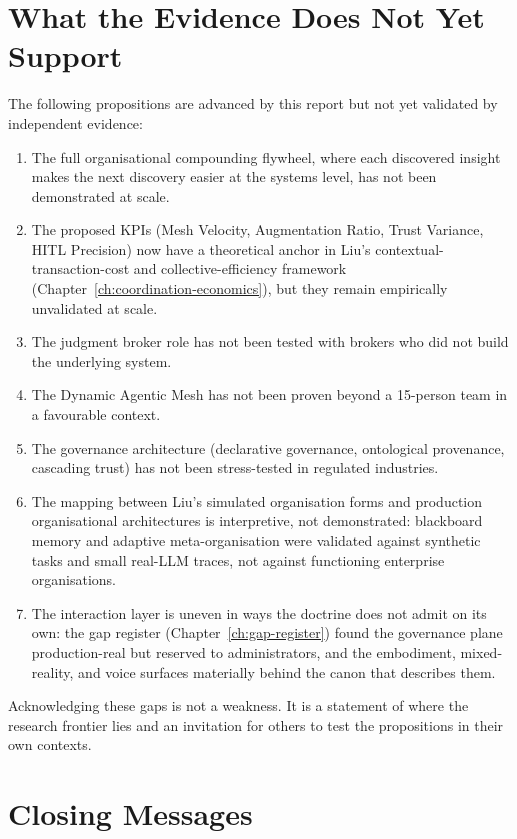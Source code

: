 \section{What the Evidence Does Not Yet Support}

The following propositions are advanced by this report but not yet validated by independent evidence:

\begin{enumerate}
  \item The full organisational compounding flywheel, where each discovered insight makes the next discovery easier at the systems level, has not been demonstrated at scale.
  \item The proposed KPIs (Mesh Velocity, Augmentation Ratio, Trust Variance, HITL Precision) now have a theoretical anchor in Liu's contextual-transaction-cost and collective-efficiency framework (Chapter~\ref{ch:coordination-economics}), but they remain empirically unvalidated at scale.
  \item The judgment broker role has not been tested with brokers who did not build the underlying system.
  \item The Dynamic Agentic Mesh has not been proven beyond a 15-person team in a favourable context.
  \item The governance architecture (declarative governance, ontological provenance, cascading trust) has not been stress-tested in regulated industries.
  \item The mapping between Liu's simulated organisation forms and production organisational architectures is interpretive, not demonstrated: blackboard memory and adaptive meta-organisation were validated against synthetic tasks and small real-LLM traces, not against functioning enterprise organisations.
  \item The interaction layer is uneven in ways the doctrine does not admit on its own: the gap register (Chapter~\ref{ch:gap-register}) found the governance plane production-real but reserved to administrators, and the embodiment, mixed-reality, and voice surfaces materially behind the canon that describes them.
\end{enumerate}

Acknowledging these gaps is not a weakness. It is a statement of where the research frontier lies and an invitation for others to test the propositions in their own contexts.

\section{Closing Messages}

